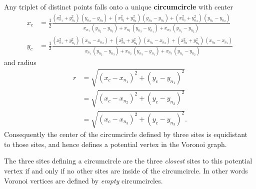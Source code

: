 \documentclass[
  letterpaper,
  DIV=11,
  numbers=noendperiod]{scrartcl}
\begin{document}
Any triplet of distinct points falls onto a unique \textbf{circumcircle}
with center \begin{align*}
x_{c}
&=
\frac{1}{2}
\frac{
  \left( x_{n_{1}}^{2} + y_{n_{1}}^{2} \right) \,
    (y_{n_{2}} - y_{n_{3}})
+ \left( x_{n_{2}}^{2} + y_{n_{2}}^{2} \right) \,
    (y_{n_{3}} - y_{n_{1}})
+ \left( x_{n_{3}}^{2} + y_{n_{3}}^{2} \right) \,
    (y_{n_{1}} - y_{n_{2}})
}{
  x_{n_{1}} \, (y_{n_{2}} - y_{n_{3}} )
+ x_{n_{2}} \, (y_{n_{3}} - y_{n_{1}} )
+ x_{n_{3}} \, (y_{n_{1}} - y_{n_{2}} )
}
\\
y_{c}
&=
\frac{1}{2}
\frac{
  \left( x_{n_{1}}^{2} + y_{n_{1}}^{2} \right) \,
    (x_{n_{3}} - x_{n_{2}})
+ \left( x_{n_{2}}^{2} + y_{n_{2}}^{2} \right) \,
    (x_{n_{1}} - x_{n_{3}})
+ \left( x_{n_{3}}^{2} + y_{n_{3}}^{2} \right) \,
    (x_{n_{2}} - x_{n_{1}})
}{
  x_{n_{1}} \, (y_{n_{2}} - y_{n_{3}} )
+ x_{n_{2}} \, (y_{n_{3}} - y_{n_{1}} )
+ x_{n_{3}} \, (y_{n_{1}} - y_{n_{2}} )
}
\end{align*} and radius \begin{align*}
r
&=
\sqrt{ (x_{c} - x_{n_{1}})^{2} + (y_{c} - y_{n_{1}})^{2} }
\\
&=
\sqrt{ (x_{c} - x_{n_{2}})^{2} + (y_{c} - y_{n_{2}})^{2} }
\\
&=
\sqrt{ (x_{c} - x_{n_{3}})^{2} + (y_{c} - y_{n_{3}})^{2} }.
\end{align*} Consequently the center of the circumcircle defined by
three sites is equidistant to those sites, and hence defines a potential
vertex in the Voronoi graph.

The three sites defining a circumcircle are the three \emph{closest}
sites to this potential vertex if and only if no other sites are inside
of the circumcircle. In other words Voronoi vertices are defined by
\emph{empty} circumcircles.
\end{document}
